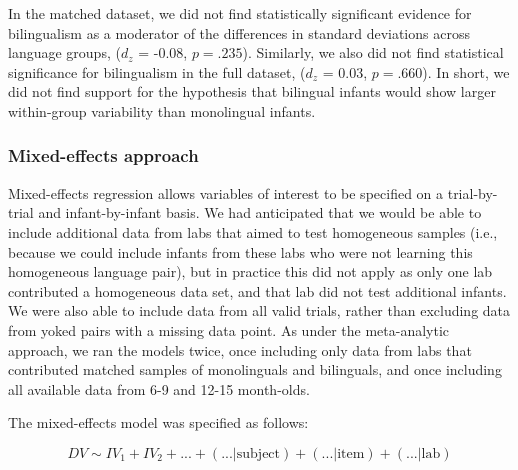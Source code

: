 \documentclass[,man,floatsintext]{apa6}
\begin{document}
In the matched dataset, we did not find statistically significant evidence for bilingualism as a moderator of the differences in standard deviations across language groups, (\(d_z\) = -0.08, \(p = .235\)). Similarly, we also did not find statistical significance for bilingualism in the full dataset, (\(d_z\) = 0.03, \(p = .660\)). In short, we did not find support for the hypothesis that bilingual infants would show larger within-group variability than monolingual infants.

\hypertarget{mixed-effects-approach}{%
\subsubsection{Mixed-effects approach}\label{mixed-effects-approach}}

Mixed-effects regression allows variables of interest to be specified on a trial-by-trial and infant-by-infant basis. We had anticipated that we would be able to include additional data from labs that aimed to test homogeneous samples (i.e., because we could include infants from these labs who were not learning this homogeneous language pair), but in practice this did not apply as only one lab contributed a homogeneous data set, and that lab did not test additional infants. We were also able to include data from all valid trials, rather than excluding data from yoked pairs with a missing data point. As under the meta-analytic approach, we ran the models twice, once including only data from labs that contributed matched samples of monolinguals and bilinguals, and once including all available data from 6-9 and 12-15 month-olds.

The mixed-effects model was specified as follows:

\[DV \sim IV_1 + IV_2 + \text{...} + (\text{...} | \text{subject}) + (\text{...} | \text{item}) + (\text{...} | \text{lab})\]
\end{document}
